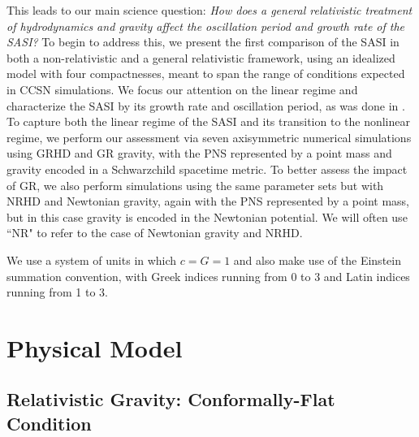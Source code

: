 This leads to our main science question:
\emph{How does a general relativistic treatment of hydrodynamics and gravity
affect the oscillation period and growth rate
of the SASI?}
To begin to address this, we
present the first comparison of the SASI in both a non-relativistic
and a general relativistic framework, using an idealized model
with four compactnesses, meant to span the range of conditions
expected in CCSN simulations.
We focus our attention on the linear regime and characterize the SASI by its
growth rate and oscillation period, as was done in \citet{bm2006}.
To capture both the linear regime of the SASI and its transition to the
nonlinear regime,
we perform our assessment via seven axisymmetric numerical
simulations using GRHD and GR gravity, with the PNS represented by a point mass
and gravity encoded in a Schwarzchild spacetime metric.
To better assess the impact of GR, we also perform simulations
using the same parameter sets but
with NRHD and Newtonian gravity, again with the PNS represented by a point
mass, but in this case gravity is encoded in the Newtonian potential.
We will often use ``NR" to refer to the case of Newtonian gravity
and NRHD.

We use a system of units in which $c=G=1$ and also make use of the Einstein
summation convention, with Greek indices running from 0 to 3 and Latin indices
running from 1 to 3.

\section{Physical Model}

\subsection{Relativistic Gravity: Conformally-Flat Condition}

